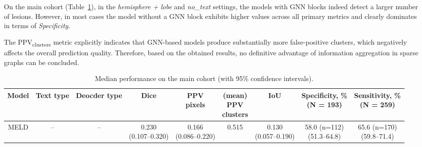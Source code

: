 \documentclass[FCD_GNN.tex]{subfiles}
\begin{document}
On the main cohort (Table~\ref{tab:main_cohort_final}), in the \textit{hemisphere + lobe} and \textit{no\_text} settings, the models with GNN blocks indeed detect a larger number of lesions. 
However, in most cases the model without a GNN block exhibits higher values across all primary metrics and clearly dominates in terms of \textit{Specificity}.

The PPV\textsubscript{clusters} metric explicitly indicates that GNN-based models produce substantially more false-positive clusters, which negatively affects the overall prediction quality. Therefore, based on the obtained results, no definitive advantage of information aggregation in sparse graphs can be concluded.
\begin{table}[H]
\tiny
\begin{threeparttable}
\centering
\caption{Median performance on the main cohort (with 95\% confidence intervals).} 
\label{tab:main_cohort_final}
\begin{tabular}{ccccccccc}
\textbf{Model} &
\textbf{Text type} &
\textbf{Deocder type} &
\textbf{Dice} &
\makecell{\textbf{PPV}\\\textbf{pixels}} &
\makecell{\textbf{(mean)} \\\textbf{PPV}\\\textbf{clusters}} & 
\textbf{IoU} & 
\makecell{\textbf{Specificity, \%} \\ (N = 193)}&
\makecell{\textbf{Sensitivity, \%} \\ (N = 259)}\\
\midrule
MELD &
-- &
-- &
\makecell{0.230\\(0.107--0.320)} &
\makecell{0.166\\(0.086--0.220)} &
0.515 &
\makecell{0.130\\(0.057--0.190)} &
\makecell{58.0 (n=112) \\ (51.3--64.8)} &
\makecell{65.6 (n=170) \\ (59.8--71.4)} \\

\hline


\end{tabular}
\end{threeparttable}
\end{table}
\end{document}
